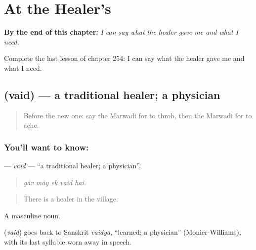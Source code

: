
\chapter{At the Healer's}
\label{ch:mw-at-the-healer-s}

\begin{chapteropening}
\textbf{By the end of this chapter:} \emph{I can say what the healer gave me and what I need.}

Complete the last lesson of chapter 254: I can say what the healer gave me and what I need.
\end{chapteropening}

\section[\texorpdfstring{\mw{वैद} (vaid)}{वैद (vaid)}]{ (vaid) — a traditional healer; a physician}

\label{lesson:MW-C254-vaid}



\begin{quote}
Before the new one: say the Marwadi for to throb, then the Marwadi for to ache.
\end{quote}

\subsection*{You'll want to know: }
\textbf{} — \emph{vaid} — \textquotedblleft{}a traditional healer; a physician\textquotedblright{}.

\begin{quote}
    
\end{quote}

\begin{quote}
\emph{gā̃v mā̃y ek vaid hai.}
\end{quote}

\begin{quote}
There is a healer in the village.
\end{quote}

A masculine noun.

\begin{cousinweb}
\textbf{} (\emph{vaid}) goes back to Sanskrit \emph{vaidya}, \textquotedblleft{}learned; a physician\textquotedblright{} (Monier-Williams), with its last syllable worn away in speech.
\end{cousinweb}

